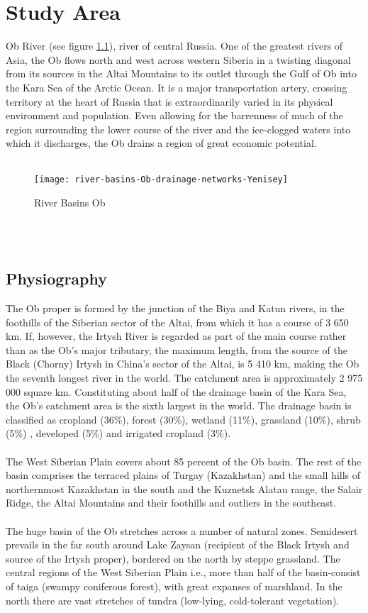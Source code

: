 \chapter{Study Area}
Ob River (see figure \ref{fig:Ob Basin}), river of central Russia. One of the greatest rivers of Asia, the Ob flows north and west across western Siberia in a twisting diagonal from its sources in the Altai Mountains to its outlet through the Gulf of Ob into the Kara Sea of the Arctic Ocean. It is a major transportation artery, crossing territory at the heart of Russia that is extraordinarily varied in its physical environment and population. Even allowing for the barrenness of much of the region surrounding the lower course of the river and the ice-clogged waters into which it discharges, the Ob drains a region of great economic potential.\\\\
\begin{figure}[htbp]
	\centering
	\texttt{[image: river-basins-Ob-drainage-networks-Yenisey]} %
	\caption{River Basins Ob} 
	\label{fig:Ob Basin}
\end{figure}\\\\
\section{Physiography}
The Ob proper is formed by the junction of the Biya and Katun rivers, in the foothills of the Siberian sector of the Altai, from which it has a course of 3 650 km. If, however, the Irtysh River is regarded as part of the main course rather than as the Ob's major tributary, the maximum length, from the source of the Black (Chorny) Irtysh in China's sector of the Altai, is 5 410 km, making the Ob the seventh longest river in the world. The catchment area is approximately 2 975 000 square km. Constituting about half of the drainage basin of the Kara Sea, the Ob's catchment area is the sixth largest in the world. The drainage basin is classified as cropland (36\%), forest (30\%), wetland (11\%), grassland (10\%), shrub (5\%) , developed (5\%) and irrigated cropland (3\%).\cite{revenga1998watersheds}\\\\
The West Siberian Plain covers about 85 percent of the Ob basin.\cite{Obriver} The rest of the basin comprises the terraced plains of Turgay (Kazakhstan) and the small hills of northernmost Kazakhstan in the south and the Kuznetsk Alatau range, the Salair Ridge, the Altai Mountains and their foothills and outliers in the southeast.\\\\
The huge basin of the Ob stretches across a number of natural zones. Semidesert prevails in the far south around Lake Zaysan (recipient of the Black Irtysh and source of the Irtysh proper), bordered on the north by steppe grassland. The central regions of the West Siberian Plain i.e., more than half of the basin-consist of taiga (swampy coniferous forest), with great expanses of marshland. In the north there are vast stretches of tundra (low-lying, cold-tolerant vegetation).
